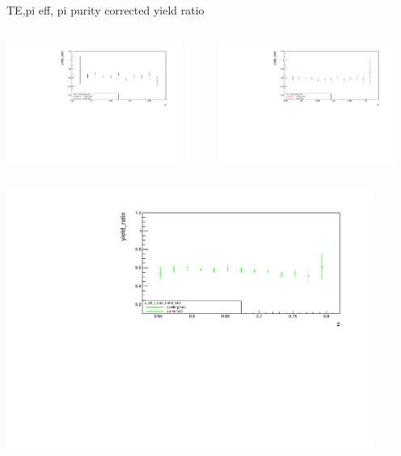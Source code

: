 \begin{frame}{TE,pi eff, pi purity corrected yield ratio}
\begin{columns}
\begin{column}[T]{0.5\textwidth}
\includegraphics[width = 0.9\textwidth]{results/yield/statistics_corr/x_Q2_z_55_5500_45_ratio.pdf}
\end{column}
\begin{column}[T]{0.5\textwidth}
\includegraphics[width = 0.9\textwidth]{results/yield/statistics_corr/x_Q2_z_55_5500_55_ratio.pdf}
\end{column}
\end{columns}
\begin{columns}
\begin{column}[T]{0.5\textwidth}
\includegraphics[width = 0.9\textwidth]{results/yield/statistics_corr/x_Q2_z_55_5500_65_ratio.pdf}

\end{column}
\end{columns}
\end{frame}
